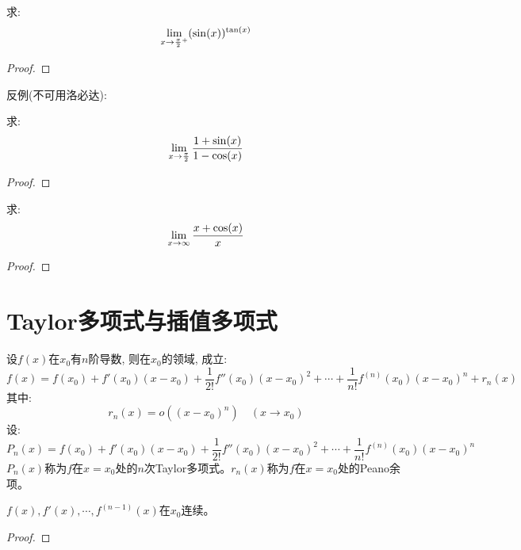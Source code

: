 \begin{example}
    求:
    \begin{equation*}
        \lim_{x \to \frac{\pi}{2}^+ } (\sin(x))^{\tan(x)}
    \end{equation*}
\end{example}
\begin{proof}
    
\end{proof}

反例(不可用洛必达):
\begin{example}
    求:
    \begin{equation*}
        \lim_{x \to \frac{\pi}{2} } \frac{1+\sin(x)}{1-\cos(x)}
    \end{equation*}
\end{example}
\begin{proof}
    
\end{proof}

\begin{example}
    求:
    \begin{equation*}
        \lim_{x \to \infty } \frac{x+\cos(x)}{x}
    \end{equation*}
\end{example}
\begin{proof}
    
\end{proof}

\section{Taylor多项式与插值多项式}
\begin{theorem}[带Peano余项的Taylor公式]
    设$f(x)$在$x_0$有$n$阶导数, 则在$x_0$的领域, 成立:
    \begin{equation*}
        f(x) = f(x_0) + f'(x_0)(x-x_0) + \frac{1}{2!}f''(x_0)(x-x_0)^2+\cdots+\frac{1}{n!}f^{(n)}(x_0)(x-x_0)^n+r_n(x)
    \end{equation*}
    其中:
    \begin{equation*}
        r_n(x) = o((x-x_0)^n) \quad (x \to x_0)
    \end{equation*}
    设:
    \begin{equation*}
        P_n(x) = f(x_0) + f'(x_0)(x-x_0) + \frac{1}{2!}f''(x_0)(x-x_0)^2+\cdots+\frac{1}{n!}f^{(n)}(x_0)(x-x_0)^n
    \end{equation*}
    $P_n(x)$称为$f$在$x=x_0$处的$n$次Taylor多项式。$r_n(x)$称为$f$在$x=x_0$处的Peano余项。
\end{theorem}
\begin{remark}
    $f(x), f'(x), \cdots, f^{(n-1)}(x)$在$x_0$连续。
\end{remark}
\begin{proof}
    
\end{proof}
